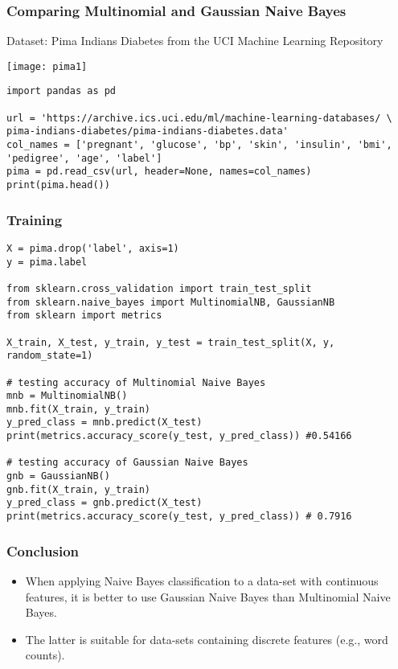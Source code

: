 \begin{frame}[fragile]\frametitle{Comparing Multinomial and Gaussian Naive Bayes}
Dataset: Pima Indians Diabetes from the UCI Machine Learning Repository

\begin{center}
\texttt{[image: pima1]}
\end{center}

\begin{lstlisting}
import pandas as pd

url = 'https://archive.ics.uci.edu/ml/machine-learning-databases/ \
pima-indians-diabetes/pima-indians-diabetes.data'
col_names = ['pregnant', 'glucose', 'bp', 'skin', 'insulin', 'bmi', 'pedigree', 'age', 'label']
pima = pd.read_csv(url, header=None, names=col_names)
print(pima.head())
\end{lstlisting}

\end{frame}

\begin{frame}[fragile]\frametitle{Training}
\begin{lstlisting}
X = pima.drop('label', axis=1)
y = pima.label

from sklearn.cross_validation import train_test_split
from sklearn.naive_bayes import MultinomialNB, GaussianNB
from sklearn import metrics

X_train, X_test, y_train, y_test = train_test_split(X, y, random_state=1)

# testing accuracy of Multinomial Naive Bayes
mnb = MultinomialNB()
mnb.fit(X_train, y_train)
y_pred_class = mnb.predict(X_test)
print(metrics.accuracy_score(y_test, y_pred_class)) #0.54166

# testing accuracy of Gaussian Naive Bayes
gnb = GaussianNB()
gnb.fit(X_train, y_train)
y_pred_class = gnb.predict(X_test)
print(metrics.accuracy_score(y_test, y_pred_class)) # 0.7916
\end{lstlisting}
\end{frame}

\begin{frame}[fragile]\frametitle{Conclusion}
\begin{itemize}
\item When applying Naive Bayes classification to a data-set with continuous features, it is better to use Gaussian Naive Bayes than Multinomial Naive Bayes.
\item  The latter is suitable for data-sets containing discrete features (e.g., word counts).
\end{itemize}
\end{frame}
